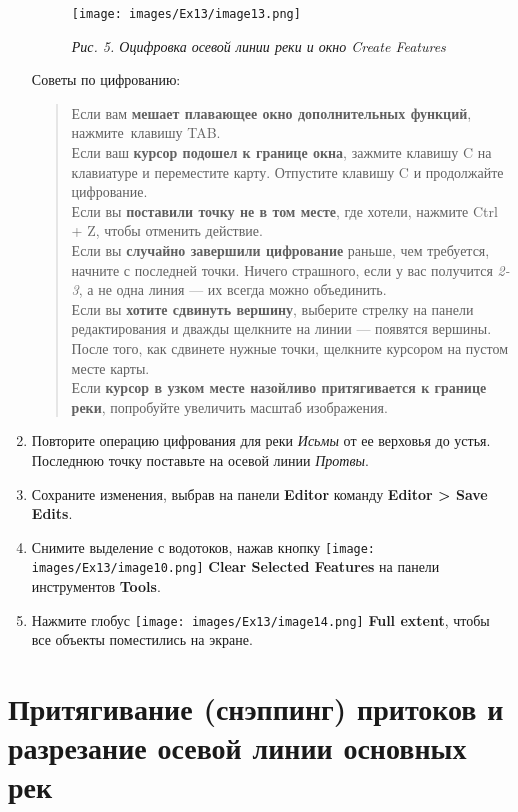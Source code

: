 \documentclass[12pt,]{book}
\begin{document}
\begin{enumerate}
  \begin{figure}
  \centering
  \texttt{[image: images/Ex13/image13.png]}
  \caption{\emph{Рис. 5. Оцифровка осевой линии реки и окно Create Features}}
  \end{figure}

  Советы по цифрованию:

  \begin{quote}
  Если вам \textbf{мешает плавающее окно дополнительных функций}, нажмите~клавишу TAB.\\
  Если ваш \textbf{курсор подошел к границе окна}, зажмите клавишу C на клавиатуре и переместите карту. Отпустите клавишу C и продолжайте цифрование.\\
  Если вы \textbf{поставили точку не в том месте}, где хотели, нажмите Ctrl + Z, чтобы отменить действие.\\
  Если вы \textbf{случайно завершили цифрование} раньше, чем требуется, начните с последней точки. Ничего страшного, если у вас получится \emph{2-3}, а не одна линия --- их всегда можно объединить.\\
  Если вы \textbf{хотите сдвинуть вершину}, выберите стрелку на панели редактирования и дважды щелкните на линии --- появятся вершины. После того, как сдвинете нужные точки, щелкните курсором на пустом месте карты.\\
  Если \textbf{курсор в узком месте назойливо притягивается к границе реки}, попробуйте увеличить масштаб изображения.
  \end{quote}
\item
  Повторите операцию цифрования для реки \emph{Исьмы} от ее верховья до устья. Последнюю точку поставьте на осевой линии \emph{Протвы}.
\item
  Сохраните изменения, выбрав на панели \textbf{Editor} команду \textbf{Editor \textgreater{} Save Edits}.
\item
  Снимите выделение с водотоков, нажав кнопку \texttt{[image: images/Ex13/image10.png]} \textbf{Clear Selected Features} на панели инструментов \textbf{Tools}.
\item
  Нажмите глобус \texttt{[image: images/Ex13/image14.png]} \textbf{Full extent}, чтобы все объекты поместились на экране.
\end{enumerate}

\hypertarget{section-4}{%
\section{Притягивание (снэппинг) притоков и разрезание осевой линии основных рек}\label{section-4}}
\end{document}
